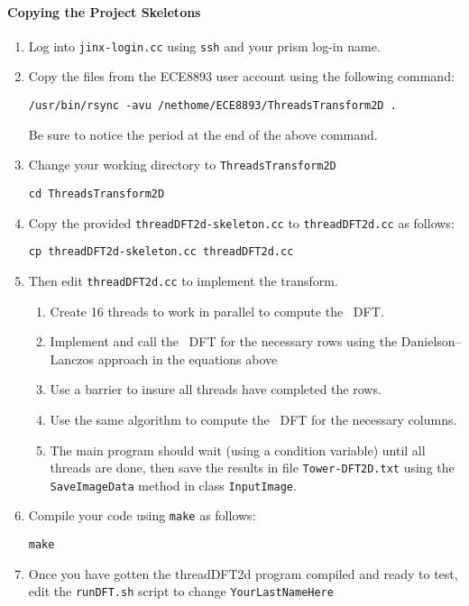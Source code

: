 \documentclass[10pt]{article}
\begin{document}
\paragraph{Copying the Project Skeletons}
\begin{enumerate}
\item Log into {\tt jinx-login.cc} using {\tt ssh} and your prism log-in name.
\item Copy the files from the ECE8893 user account using the following
command:
\begin{verbatim}
/usr/bin/rsync -avu /nethome/ECE8893/ThreadsTransform2D .
\end{verbatim}
Be sure to notice the period at the end of the above command.
\item Change your working directory to {\tt ThreadsTransform2D}
\begin{verbatim}
cd ThreadsTransform2D
\end{verbatim}
\item Copy the provided {\tt threadDFT2d-skeleton.cc} to {\tt threadDFT2d.cc} as follows:
\begin{verbatim}
cp threadDFT2d-skeleton.cc threadDFT2d.cc
\end{verbatim}
\item Then edit {\tt threadDFT2d.cc} to implement the transform.
\begin{enumerate}
\item Create 16 threads to work in parallel to compute the \td\ DFT.
\item Implement and call the \od\ DFT for the necessary rows
using the Danielson--Lanczos approach
in the equations above
\item Use a barrier to insure all threads have completed the rows.
\item Use the same algorithm to compute the \od\ DFT for the
necessary columns.
\item The main program should wait (using a condition variable) until
all threads are done, then save the results in file
{\tt Tower-DFT2D.txt} using the {\tt SaveImageData} method in
class {\tt InputImage}.
\end{enumerate}
\item Compile your code using {\tt make} as follows:
\begin{verbatim}
make
\end{verbatim}
\item Once you have gotten the threadDFT2d program compiled and ready to test,
edit the {\tt runDFT.sh} script to change {\tt YourLastNameHere}

\end{enumerate}
\end{document}
